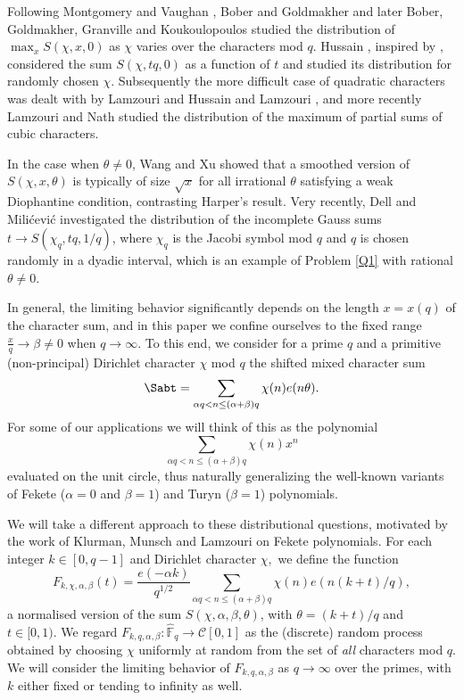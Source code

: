 \documentclass[12pt, a4paper]{amsart}
\theoremstyle{remark}
\begin{document}
Following Montgomery and Vaughan \cite{MV-meanvalues},
Bober and Goldmakher \cite{BG-maximum} and later Bober, Goldmakher, Granville
and Koukoulopoulos \cite{BGGK} studied the distribution of $\max_{x} S(\chi,x, 0)$
as $\chi$ varies over the characters mod $q$. Hussain \cite{hussain-character-paths},
inspired by \cite{kowalski-sawin},
considered the
sum $S(\chi, tq,  0)$ as a function of $t$ and studied its distribution for randomly chosen $\chi$.
Subsequently the more difficult case of quadratic characters was dealt with by
Lamzouri \cite{lamzouri-quadraticmax} and Hussain and Lamzouri
\cite{lamzouri-hussain}, and more recently Lamzouri and Nath
\cite{nath-lamzouri} studied the distribution of the maximum of partial sums of
cubic characters.

In the case when $\theta\neq 0$, Wang and Xu \cite{wang-xu} showed that a smoothed version of $S(\chi, x, \theta)$ is typically of size $\sqrt x$ for all irrational $\theta$ satisfying a weak Diophantine condition, contrasting Harper's result.
Very recently, Dell and Milićević \cite{dell-milicevic} investigated the distribution
of the incomplete Gauss sums $t \rightarrow S(\chi_q, tq, 1/q)$,
where $\chi_q$ is the Jacobi symbol mod $q$ and $q$ is chosen randomly in a dyadic interval, which is
an example of Problem \ref{Q1} with rational $\theta \ne 0.$

In general, the limiting behavior significantly depends on the length $x=x(q)$ of the
character sum, and in this paper we confine ourselves to the fixed range
$\frac{x}{q}\to \beta\ne 0$ when $q\to\infty.$ To this end,  we consider for a
prime $q$ and a primitive (non-principal) Dirichlet character $\chi$ mod $q$ the shifted mixed
character sum
\[
    \Sabt = \sum_{\alpha q < n \leq (\alpha + \beta) q} \chi(n)e(n\theta).
\]
For some of our applications we will think of this as the polynomial
\[
    \sum_{\alpha q < n \leq (\alpha + \beta) q} \chi(n)x^n
\]
evaluated on the unit circle, thus naturally generalizing the well-known
variants of Fekete ($\alpha = 0$ and $\beta = 1$) and Turyn ($\beta = 1$)
polynomials.

We will take a different approach to these distributional questions, motivated
by the work of Klurman, Munsch and Lamzouri \cite{KLM-fekete} on Fekete
polynomials. For each integer $k\in [0,q-1]$ and Dirichlet character $\chi,$ we
define the function
\[
    F_{k,\chi,\alpha,\beta}(t) = \frac{e(-\alpha k)}{q^{1/2}}
        \sum_{\alpha q < n \leq (\alpha + \beta) q} \chi(n)e(n(k+t)/q),
\]
a normalised version of the sum $S(\chi, \alpha, \beta, \theta)$, with $\theta = (k+t)/q$ and $t\in [0,1).$ We regard
$F_{k,q,\alpha,\beta}:\widehat{\mathbb{F}}_q\rightarrow \mathscr C[0,1]$ as the (discrete) random
process obtained by choosing $\chi$ uniformly at random from the set of {\it
all} characters mod $q.$ We will consider the limiting behavior of
$F_{k,q,\alpha,\beta}$ as $q \rightarrow \infty$ over the primes, with $k$ either
fixed or tending to infinity as well.
\end{document}
